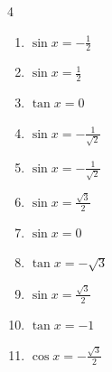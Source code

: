 \begin{multicols}{4}
\begin{enumerate}
  \item $\displaystyle \sin{x}  = -\frac{1}{2}$


\columnbreak %

\resetques

  \item $\displaystyle \sin{x}  = \frac{1}{2}$


  \item $\displaystyle \tan{x}  = 0$

        \phantom{$\displaystyle x = 0 , \pi$}

  \item $\displaystyle \sin{x}  = -\frac{1}{\sqrt{2}}$


  \item $\displaystyle \sin{x}  = -\frac{1}{\sqrt{2}}$


  \item $\displaystyle \sin{x}  = \frac{\sqrt{3}}{2}$


  \item $\displaystyle \sin{x}  = 0$

        \phantom{$\displaystyle x = 0 , \pi$}

  \item $\displaystyle \tan{x}  = -\sqrt{3}$


  \item $\displaystyle \sin{x}  = \frac{\sqrt{3}}{2}$


  \item $\displaystyle \tan{x}  = -1$


  \item $\displaystyle \cos{x}  = -\frac{\sqrt{3}}{2}$



\end{enumerate}
\end{multicols}
